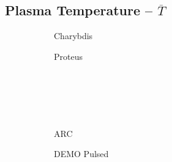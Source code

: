 \subsection*{ Plasma Temperature -- $\overline T$ }
  \label{subsection:scan_T_bar}

\begin{figure*}[h!]
    \centering
    \hfill
    \begin{subfigure}[t]{0.45\textwidth}
        \centering
    \begin{adjustbox}{width=\textwidth}
      \Large
      
    \end{adjustbox}
        \caption{Charybdis}
    \end{subfigure}
    \hfill
    \begin{subfigure}[t]{0.45\textwidth}
        \centering
    \begin{adjustbox}{width=\textwidth}
      \Large
      
    \end{adjustbox}
        \caption{Proteus}
    \end{subfigure}
    \hfill \hfill ~\\ ~\\ ~\\ ~\\
    \hfill
    \begin{subfigure}[t]{0.45\textwidth}
        \centering
    \begin{adjustbox}{width=\textwidth}
      \Large
      
    \end{adjustbox}
        \caption{ARC}
    \end{subfigure}
    \hfill
    \begin{subfigure}[t]{0.45\textwidth}
        \centering
    \begin{adjustbox}{width=\textwidth}
      \Large
      
    \end{adjustbox}
        \caption{DEMO Pulsed}
    \end{subfigure}
    \hfill \hfill ~\\ ~\\ ~\\ ~\\
    \hfill
    \begin{subfigure}[t]{0.45\textwidth}
        \centering
    \begin{adjustbox}{width=\textwidth}
      \Large
      

\end{adjustbox}
\end{subfigure}
\end{figure*}
